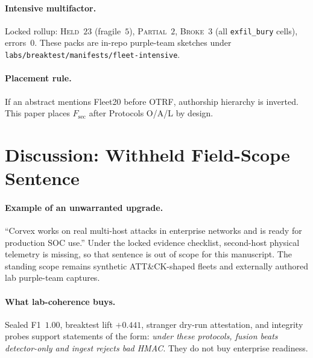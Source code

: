 \documentclass[conference,compsoc]{IEEEtran}
\begin{document}
\paragraph{Intensive multifactor.}
Locked rollup: \textsc{Held}~$23$ (fragile~$5$), \textsc{Partial}~$2$,
\textsc{Broke}~$3$ (all \texttt{exfil\_bury} cells), errors~$0$.
These packs are in-repo purple-team sketches under
\texttt{labs/breaktest/manifests/fleet-intensive}.

\paragraph{Placement rule.}
If an abstract mentions Fleet20 before OTRF, authorship hierarchy is inverted.
This paper places $F_{\mathrm{sec}}$ after Protocols O/A/L by design.

\section{Discussion: Withheld Field-Scope Sentence}
\label{sec:vignette}

\paragraph{Example of an unwarranted upgrade.}
``Corvex works on real multi-host attacks in enterprise networks and is ready
for production SOC use.''
Under the locked evidence checklist, second-host physical telemetry is missing,
so that sentence is out of scope for this manuscript.
The standing scope remains synthetic ATT\&CK-shaped fleets and externally
authored lab purple-team captures.

\paragraph{What lab-coherence buys.}
Sealed F1~$1.00$, breaktest lift $+0.441$, stranger dry-run attestation, and
integrity probes support statements of the form: \emph{under these protocols,
fusion beats detector-only and ingest rejects bad HMAC}.
They do not buy enterprise readiness.
\end{document}
